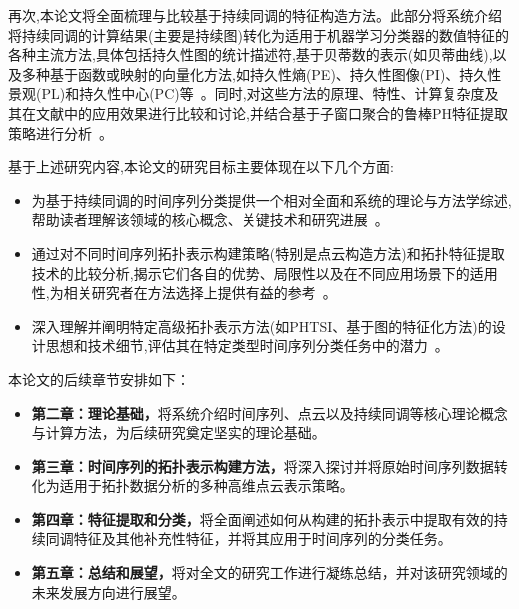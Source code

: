 再次,本论文将全面梳理与比较基于持续同调的特征构造方法。此部分将系统介绍将持续同调的计算结果(主要是持续图)转化为适用于机器学习分类器的数值特征的各种主流方法,具体包括持久性图的统计描述符,基于贝蒂数的表示(如贝蒂曲线),以及多种基于函数或映射的向量化方法,如持久性熵(PE)、持久性图像(PI)、持久性景观(PL)和持久性中心(PC)等~。同时,对这些方法的原理、特性、计算复杂度及其在文献中的应用效果进行比较和讨论,并结合基于子窗口聚合的鲁棒PH特征提取策略进行分析~。

基于上述研究内容,本论文的研究目标主要体现在以下几个方面:
\begin{itemize}
    \item 为基于持续同调的时间序列分类提供一个相对全面和系统的理论与方法学综述,帮助读者理解该领域的核心概念、关键技术和研究进展~。
    \item 通过对不同时间序列拓扑表示构建策略(特别是点云构造方法)和拓扑特征提取技术的比较分析,揭示它们各自的优势、局限性以及在不同应用场景下的适用性,为相关研究者在方法选择上提供有益的参考~。
    \item 深入理解并阐明特定高级拓扑表示方法(如PHTSI、基于图的特征化方法)的设计思想和技术细节,评估其在特定类型时间序列分类任务中的潜力~。
\end{itemize}

本论文的后续章节安排如下：
\begin{itemize}
    \item \textbf{第二章：理论基础，}将系统介绍时间序列、点云以及持续同调等核心理论概念与计算方法，为后续研究奠定坚实的理论基础。
    \item \textbf{第三章：时间序列的拓扑表示构建方法，}将深入探讨并将原始时间序列数据转化为适用于拓扑数据分析的多种高维点云表示策略。
    \item \textbf{第四章：特征提取和分类，}将全面阐述如何从构建的拓扑表示中提取有效的持续同调特征及其他补充性特征，并将其应用于时间序列的分类任务。
    \item \textbf{第五章：总结和展望，}将对全文的研究工作进行凝练总结，并对该研究领域的未来发展方向进行展望。
\end{itemize}




